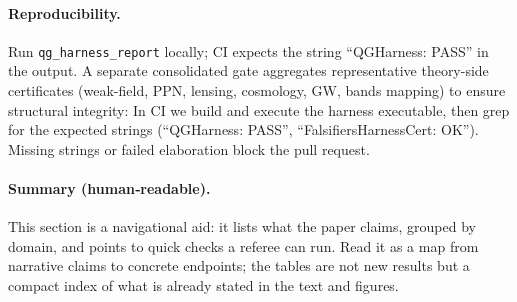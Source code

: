 \documentclass[aps,prd,twocolumn,superscriptaddress,nofootinbib,floatfix,longbibliography]{revtex4-2}
\begin{document}
\paragraph*{Reproducibility.}
Run \texttt{qg\_harness\_report} locally; CI expects the string ``QGHarness: PASS'' in the output.
A separate consolidated gate aggregates representative theory-side certificates (weak-field, PPN, lensing, cosmology, GW, bands mapping) to ensure structural integrity:
In CI we build and execute the harness executable, then grep for the expected strings (``QGHarness: PASS'', ``FalsifiersHarnessCert: OK''). Missing strings or failed elaboration block the pull request.
%
%
%
\paragraph*{Summary (human‑readable).}
This section is a navigational aid: it lists what the paper claims, grouped by domain, and points to quick checks a referee can run. Read it as a map from narrative claims to concrete endpoints; the tables are not new results but a compact index of what is already stated in the text and figures.
\end{document}
